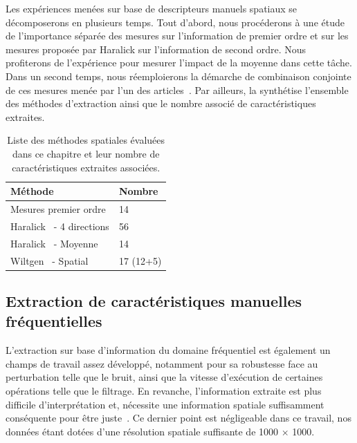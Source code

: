 Les expériences menées sur base de descripteurs manuels spatiaux se décomposerons en plusieurs temps. Tout d'abord, nous procéderons à une étude de l'importance séparée des mesures sur l'information de premier ordre et sur les mesures proposée par Haralick sur l'information de second ordre. Nous profiterons de l'expérience pour mesurer l'impact de la moyenne dans cette tâche. Dans un second temps, nous réemploierons la démarche de combinaison conjointe de ces mesures menée par l'un des articles~\cite{Wiltgen2008}. Par ailleurs, la  synthétise l'ensemble des méthodes d'extraction ainsi que le nombre associé de caractéristiques extraites.\par
\begin{table}[h]
    \centering
    \begin{tabular*}{0.6\linewidth}{l@{\extracolsep{\fill}}l}
        \toprule
        \textbf{Méthode}                            & \textbf{Nombre}   \\ \hline
        Mesures premier ordre                       & 14                \\ \hline
        Haralick~\cite{Haralick1973} - 4 directions & 56                \\ \hline
        Haralick~\cite{Haralick1973} - Moyenne      & 14                \\ \hline
        Wiltgen~\cite{Wiltgen2008} - Spatial        & 17 (12+5)         \\
        \bottomrule
    \end{tabular*}
    \caption{Liste des méthodes spatiales évaluées dans ce chapitre et leur nombre de caractéristiques extraites associées.}
    \label{tab:number_features_spatial}
\end{table}

\subsection{Extraction de caractéristiques manuelles fréquentielles}
L'extraction sur base d'information du domaine fréquentiel est également un champs de travail assez développé, notamment pour sa robustesse face au perturbation telle que le bruit, ainsi que la vitesse d'exécution de certaines opérations telle que le filtrage. En revanche, l'information extraite est plus difficile d'interprétation et, nécessite une information spatiale suffisamment conséquente pour être juste~\cite{Kamila2015}. Ce dernier point est négligeable dans ce travail, nos données étant dotées d'une résolution spatiale suffisante de \SI{1000}{\px} $\times$ \SI{1000}{\px}.\par

